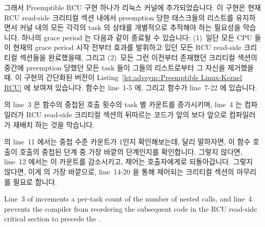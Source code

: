 그래서 Preemptible RCU 구현 하나가 리눅스 커널에 추가되었습니다.
이 구현은 현재 RCU read-side 크리티컬 섹션 내에서 preemption 당한 태스크들의
리스트를 유지하면서 커널 내의 모든 각각의 task 의 상태를 개별적으로 추적해야
하는 필요성을 막습니다.
하나의 grace period 는 다음과 같이 종료될 수 있습니다: (1)~일단 모든 CPU 들이
현재의 grace period 시작 전부터 효과를 발휘하고 있던 모든 RCU read-side
크리티컬 섹션들을 완료했을때, 그리고 (2)~모든 그런 이전부터 존재했던 크리티컬
섹션의 중간에 preemption 당했던 모든 task 들이 그들의 리스트로부터 그 자신을
제거했을 때.
이 구현의 간단화된 버전이
Listing~\ref{lst:advsync:Preemptible Linux-Kernel RCU} 에 보여져 있습니다.
 함수는 line~1-5 에, 그리고 
함수가 line~7-22 에 있습니다.

 의 line~3 은  함수의 중첩된 호출
횟수의 task 별 카운트를 증가시키며, line~4 는 컴파일러가 RCU read-side 크리티컬
섹션의 뒤따르는 코드가 앞의  보다 앞으로 컴파일러가 재배치
하는 것을 막습니다.

 의 line~11 에서는 중첩 수준 카운트가 1인지
확인해보는데, 달리 말하자면, 이 함수 호출이  호출의
중첩된 단계 중 가장 바깥의 단계인지를 확인합니다.
그렇지 않다면, line~12 에서는 이 카운트를 감소시키고, 제어는 호출자에게로
되돌아갑니다.
그렇지 않다면, 이게  의 가장 바깥으로, line~14-20 을 통해
제어되는 크리티컬 섹션의 마무리를 필요로 합니다.
\iffalse

Line~3 of  increments a per-task count of the
number of nested  calls, and
line~4 prevents the compiler from reordering the subsequent code in the
RCU read-side critical section to precede the .

